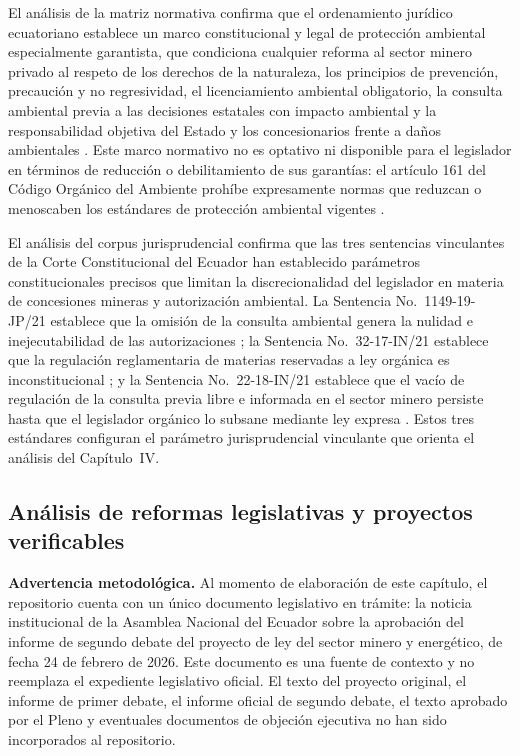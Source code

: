 El análisis de la matriz normativa confirma que el ordenamiento jurídico ecuatoriano establece un marco constitucional y legal de protección ambiental especialmente garantista, que condiciona cualquier reforma al sector minero privado al respeto de los derechos de la naturaleza, los principios de prevención, precaución y no regresividad, el licenciamiento ambiental obligatorio, la consulta ambiental previa a las decisiones estatales con impacto ambiental y la responsabilidad objetiva del Estado y los concesionarios frente a daños ambientales \parencite{cre_2008,coa_2017}. Este marco normativo no es optativo ni disponible para el legislador en términos de reducción o debilitamiento de sus garantías: el artículo 161 del Código Orgánico del Ambiente prohíbe expresamente normas que reduzcan o menoscaben los estándares de protección ambiental vigentes \parencite{coa_2017}.

El análisis del corpus jurisprudencial confirma que las tres sentencias vinculantes de la Corte Constitucional del Ecuador han establecido parámetros constitucionales precisos que limitan la discrecionalidad del legislador en materia de concesiones mineras y autorización ambiental. La Sentencia No.\ 1149-19-JP/21 establece que la omisión de la consulta ambiental genera la nulidad e inejecutabilidad de las autorizaciones \parencite{cce_1149_19_jp_21}; la Sentencia No.\ 32-17-IN/21 establece que la regulación reglamentaria de materias reservadas a ley orgánica es inconstitucional \parencite{cce_32_17_in_21}; y la Sentencia No.\ 22-18-IN/21 establece que el vacío de regulación de la consulta previa libre e informada en el sector minero persiste hasta que el legislador orgánico lo subsane mediante ley expresa \parencite{cce_22_18_in_21}. Estos tres estándares configuran el parámetro jurisprudencial vinculante que orienta el análisis del Capítulo~IV.

\subsection{Análisis de reformas legislativas y proyectos verificables}
\label{sec:analisis_reformas}

\textbf{Advertencia metodológica.} Al momento de elaboración de este capítulo, el repositorio cuenta con un único documento legislativo en trámite: la noticia institucional de la Asamblea Nacional del Ecuador sobre la aprobación del informe de segundo debate del proyecto de ley del sector minero y energético, de fecha 24 de febrero de 2026. Este documento es una fuente de contexto y no reemplaza el expediente legislativo oficial. El texto del proyecto original, el informe de primer debate, el informe oficial de segundo debate, el texto aprobado por el Pleno y eventuales documentos de objeción ejecutiva no han sido incorporados al repositorio.

